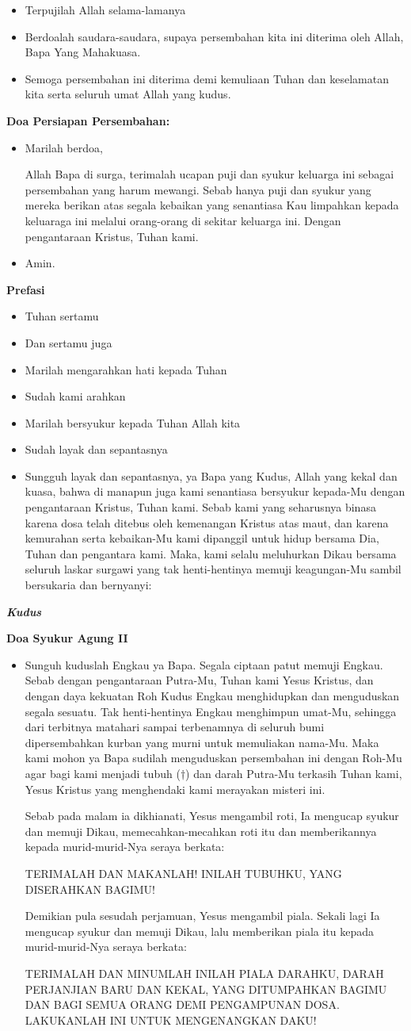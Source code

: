 \documentclass[10pt]{book}
\makeatletter
\newcommand{\subjudul}[1]{%
  {\parindent \z@ \normalfont
    \interlinepenalty\@M \bfseries #1\par\nobreak \vskip 20\p@ }}
\newcommand{\lagu}[1]{%
  {\parindent \z@ \normalfont
    \interlinepenalty\@M \bfseries \emph{#1}\par\nobreak \vskip 20\p@ }}
\newcommand{\BU}[1]{\begin{itemize} \item[U:] #1 \end{itemize}}
\newcommand{\BI}[1]{\begin{itemize} \item[I:] #1 \end{itemize}}
\makeatother
\begin{document}
\BU{Terpujilah Allah selama-lamanya}

\BI{Berdoalah saudara-saudara, supaya persembahan kita ini diterima oleh Allah, Bapa Yang Mahakuasa.}

\BU{Semoga persembahan ini diterima demi kemuliaan Tuhan dan keselamatan kita serta seluruh umat Allah yang kudus.}

\subjudul{Doa Persiapan Persembahan:}

\BI{Marilah berdoa,

Allah Bapa di surga, terimalah ucapan puji dan syukur keluarga ini sebagai persembahan yang harum mewangi. Sebab hanya puji dan syukur yang mereka berikan atas segala kebaikan yang senantiasa Kau limpahkan kepada keluaraga ini melalui orang-orang di sekitar keluarga ini. Dengan pengantaraan Kristus, Tuhan kami.}

\BU{Amin.}

\subjudul{Prefasi}

\BI{Tuhan sertamu}
\BU{Dan sertamu juga}
\BI{Marilah mengarahkan hati kepada Tuhan}
\BU{Sudah kami arahkan}
\BI{Marilah bersyukur kepada Tuhan Allah kita}
\BU{Sudah layak dan sepantasnya}
\BI{Sungguh layak dan sepantasnya, ya Bapa yang Kudus, Allah yang kekal dan kuasa, bahwa di manapun juga kami senantiasa bersyukur kepada-Mu dengan pengantaraan Kristus, Tuhan kami. Sebab kami yang seharusnya binasa karena dosa telah ditebus oleh kemenangan Kristus atas maut, dan karena kemurahan serta kebaikan-Mu kami dipanggil untuk hidup bersama Dia, Tuhan dan pengantara kami. Maka, kami selalu meluhurkan Dikau bersama seluruh laskar surgawi yang tak henti-hentinya memuji keagungan-Mu sambil bersukaria dan bernyanyi:}

\lagu{Kudus}

\subjudul{Doa Syukur Agung II}

\BI{Sunguh kuduslah Engkau ya Bapa. Segala ciptaan patut memuji Engkau. Sebab dengan pengantaraan Putra-Mu, Tuhan kami Yesus Kristus, dan dengan daya kekuatan Roh Kudus Engkau menghidupkan dan menguduskan segala sesuatu. Tak henti-hentinya Engkau menghimpun umat-Mu, sehingga dari terbitnya matahari sampai terbenamnya di seluruh bumi dipersembahkan kurban yang murni untuk memuliakan nama-Mu. Maka kami mohon ya Bapa sudilah menguduskan persembahan ini dengan Roh-Mu agar bagi kami menjadi tubuh ($\dagger$) dan darah Putra-Mu terkasih Tuhan kami, Yesus Kristus yang menghendaki kami merayakan misteri ini.

Sebab pada malam ia dikhianati, Yesus mengambil roti, Ia mengucap syukur dan memuji Dikau, memecahkan-mecahkan roti itu dan memberikannya kepada murid-murid-Nya seraya berkata:

TERIMALAH DAN MAKANLAH! INILAH TUBUHKU, YANG DISERAHKAN BAGIMU!

Demikian pula sesudah perjamuan, Yesus mengambil piala. Sekali lagi Ia mengucap syukur dan memuji Dikau, lalu memberikan piala itu kepada murid-murid-Nya seraya berkata:

TERIMALAH DAN MINUMLAH INILAH PIALA DARAHKU, DARAH PERJANJIAN BARU DAN KEKAL, YANG DITUMPAHKAN BAGIMU DAN BAGI SEMUA ORANG DEMI PENGAMPUNAN DOSA. LAKUKANLAH INI UNTUK MENGENANGKAN DAKU!}
\end{document}
